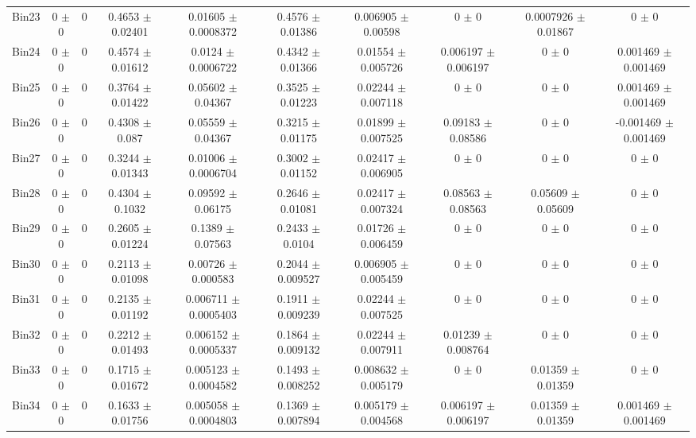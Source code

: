 \begin{tabular}{@{\extracolsep{4pt}}lccccccccc@{}}
     Bin23 & 0 $\pm$ 0 & 0 & 0.4653 $\pm$ 0.02401 & 0.01605 $\pm$ 0.0008372 & 0.4576 $\pm$ 0.01386 & 0.006905 $\pm$ 0.00598 & 0 $\pm$ 0 & 0.0007926 $\pm$ 0.01867 & 0 $\pm$ 0 \\ 
     Bin24 & 0 $\pm$ 0 & 0 & 0.4574 $\pm$ 0.01612 & 0.0124 $\pm$ 0.0006722 & 0.4342 $\pm$ 0.01366 & 0.01554 $\pm$ 0.005726 & 0.006197 $\pm$ 0.006197 & 0 $\pm$ 0 & 0.001469 $\pm$ 0.001469 \\ 
     Bin25 & 0 $\pm$ 0 & 0 & 0.3764 $\pm$ 0.01422 & 0.05602 $\pm$ 0.04367 & 0.3525 $\pm$ 0.01223 & 0.02244 $\pm$ 0.007118 & 0 $\pm$ 0 & 0 $\pm$ 0 & 0.001469 $\pm$ 0.001469 \\ 
     Bin26 & 0 $\pm$ 0 & 0 & 0.4308 $\pm$ 0.087 & 0.05559 $\pm$ 0.04367 & 0.3215 $\pm$ 0.01175 & 0.01899 $\pm$ 0.007525 & 0.09183 $\pm$ 0.08586 & 0 $\pm$ 0 & -0.001469 $\pm$ 0.001469 \\ 
     Bin27 & 0 $\pm$ 0 & 0 & 0.3244 $\pm$ 0.01343 & 0.01006 $\pm$ 0.0006704 & 0.3002 $\pm$ 0.01152 & 0.02417 $\pm$ 0.006905 & 0 $\pm$ 0 & 0 $\pm$ 0 & 0 $\pm$ 0 \\ 
     Bin28 & 0 $\pm$ 0 & 0 & 0.4304 $\pm$ 0.1032 & 0.09592 $\pm$ 0.06175 & 0.2646 $\pm$ 0.01081 & 0.02417 $\pm$ 0.007324 & 0.08563 $\pm$ 0.08563 & 0.05609 $\pm$ 0.05609 & 0 $\pm$ 0 \\ 
     Bin29 & 0 $\pm$ 0 & 0 & 0.2605 $\pm$ 0.01224 & 0.1389 $\pm$ 0.07563 & 0.2433 $\pm$ 0.0104 & 0.01726 $\pm$ 0.006459 & 0 $\pm$ 0 & 0 $\pm$ 0 & 0 $\pm$ 0 \\ 
     Bin30 & 0 $\pm$ 0 & 0 & 0.2113 $\pm$ 0.01098 & 0.00726 $\pm$ 0.000583 & 0.2044 $\pm$ 0.009527 & 0.006905 $\pm$ 0.005459 & 0 $\pm$ 0 & 0 $\pm$ 0 & 0 $\pm$ 0 \\ 
     Bin31 & 0 $\pm$ 0 & 0 & 0.2135 $\pm$ 0.01192 & 0.006711 $\pm$ 0.0005403 & 0.1911 $\pm$ 0.009239 & 0.02244 $\pm$ 0.007525 & 0 $\pm$ 0 & 0 $\pm$ 0 & 0 $\pm$ 0 \\ 
     Bin32 & 0 $\pm$ 0 & 0 & 0.2212 $\pm$ 0.01493 & 0.006152 $\pm$ 0.0005337 & 0.1864 $\pm$ 0.009132 & 0.02244 $\pm$ 0.007911 & 0.01239 $\pm$ 0.008764 & 0 $\pm$ 0 & 0 $\pm$ 0 \\ 
     Bin33 & 0 $\pm$ 0 & 0 & 0.1715 $\pm$ 0.01672 & 0.005123 $\pm$ 0.0004582 & 0.1493 $\pm$ 0.008252 & 0.008632 $\pm$ 0.005179 & 0 $\pm$ 0 & 0.01359 $\pm$ 0.01359 & 0 $\pm$ 0 \\ 
     Bin34 & 0 $\pm$ 0 & 0 & 0.1633 $\pm$ 0.01756 & 0.005058 $\pm$ 0.0004803 & 0.1369 $\pm$ 0.007894 & 0.005179 $\pm$ 0.004568 & 0.006197 $\pm$ 0.006197 & 0.01359 $\pm$ 0.01359 & 0.001469 $\pm$ 0.001469 \\ 

\end{tabular}
